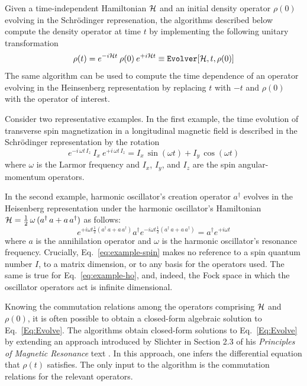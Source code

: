 

Given a time-independent Hamiltonian ${\cal H}$ and an initial density operator $\rho(0)$ evolving in the Schr\"{o}dinger represenation, the  algorithms described below compute the density operator at time $t$ by implementing the following unitary transformation
\begin{equation}
\rho(t) 
	= e^{-i {\cal H} t} \: \rho(0) \: e^{+i {\cal H} t}
	\equiv \text{{\texttt{Evolver}}}[{\cal H},t,\rho(0)]
	\label{Eq:Evolve}
\end{equation}
The same algorithm can be used to compute the time dependence of an operator evolving in the Heinsenberg representation by replacing $t$ with $-t$ and $\rho(0)$ with the operator of interest. 

Consider two representative examples. In the first example, the time evolution of transverse spin magnetization in a longitudinal magnetic field is described in the Schr\"{o}dinger representation by the rotation
\begin{equation}
e^{-i \, \omega t \, I_z} \: 
  I_x \: 
  e^{+i \, \omega t \, I_z} 
   = I_x \, \sin{(\omega t)} + I_y \, \cos{(\omega t)}
   \label{eq:example-spin}
\end{equation}
where $\omega$ is the Larmor frequency and $I_x$, $I_y$, and $I_z$ are the spin angular-momentum operators. 

In the second example, harmonic oscillator's creation operator $a^{\dagger}$ evolves in the Heisenberg representation under the harmonic oscillator's Hamiltonian ${\cal H} = \frac{1}{2}\,\omega\, (a^{\dagger} \, a + a \, a^{\dagger})$ as follows:
 \begin{equation}
 e^{+ i \omega t \frac{1}{2} (a^{\dagger} \, a + a \, a^{\dagger})} 
   a^{\dagger}
   e^{- i \omega t \frac{1}{2} (a^{\dagger} \, a + a \, a^{\dagger})} 
   =  a^{\dagger} e^{+i \omega t}
   \label{eq:example-ho}
\end{equation}
where $a$ is the annihilation operator and $\omega$ is the harmonic oscillator's resonance frequency.
Crucially, Eq.~\ref{eq:example-spin} makes no reference to a spin quantum number $I$, to a matrix dimension, or to any basis for the operators used.
The same is true for Eq.~\ref{eq:example-ho}, and, indeed, the Fock space in which the oscillator operators act is infinite dimensional. 

Knowing the commutation relations among the operators comprising ${\cal H}$ and $\rho(0)$, it is often possible to obtain a closed-form algebraic solution to Eq.~\ref{Eq:Evolve}.  
The  algorithms obtain closed-form solutions to Eq.~\ref{Eq:Evolve} by extending an approach introduced by Slichter in Section 2.3 of his \emph{Principles of Magnetic Resonance} text \cite{Slichter1990}.
In this approach, one infers the differential equation that $\rho(t)$ satisfies.
The only input to the algorithm is the commutation relations for the relevant operators.

